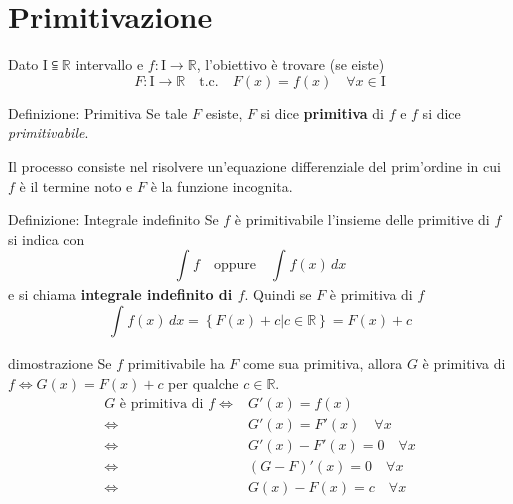 \documentclass[x11names]{article}
\begin{document}
	\newpage
	\section{Primitivazione}
	Dato $\text{I} \subseteqq \mathbb{R}$ intervallo e $f:\text{I} \to \mathbb{R}$, l'obiettivo è  trovare (se eiste)
	\[
	F: \text{I} \to \mathbb{R} \quad \text{t.c.} \quad F(x) = f(x) \quad \forall x \in \text{I}
	\]
	
		\begin{center}
		\colorbox{myblue}{\begin{minipage}{5.75in}
				\begin{blues}{Definizione: Primitiva}
					Se tale $F$ esiste, $F$ si dice \textbf{primitiva} di $f$ e $f$ si dice \textit{primitivabile}. 
				\end{blues}
		\end{minipage}}       
	\end{center}
	Il processo consiste nel risolvere un'equazione differenziale del prim'ordine in cui $f$ è il termine noto e $F$ è la funzione incognita.
	
		\begin{center}
		\colorbox{myblue}{\begin{minipage}{5.75in}
				\begin{blues}{Definizione: Integrale indefinito}
					Se $f$ è primitivabile l'insieme delle primitive di $f$ si indica con 
					\[
					\int_{}^{}f \quad \text{oppure} \quad \int_{}^{}f(x) \,dx
					\]
					e si chiama \textbf{integrale indefinito di $f$}. Quindi se  $F$ è primitiva di $f$
					\[
					\int_{}^{}f(x) \,dx  = \left\{F(x) + c | c \in \mathbb{R}\right\} = F(x) + c
					\]
				\end{blues}
		\end{minipage}}       
	\end{center}
	\begin{es}{dimostrazione}
		Se $f$ primitivabile ha $F$ come sua primitiva, allora $G$ è primitiva di $f \Longleftrightarrow G(x) = F(x) + c$ per qualche $c \in \mathbb{R}$.
		\begin{align*}
			G \text{ è primitiva di } f \Longleftrightarrow& G'(x) = f(x) \\
			\Longleftrightarrow& G'(x) = F'(x) \quad \forall x \\
			\Longleftrightarrow& G'(x) - F'(x) = 0 \quad \forall x \\
			\Longleftrightarrow& \left(G - F\right)'(x) = 0 \quad \forall x \\
			\Longleftrightarrow& G(x) - F(x) = c \quad \forall x 
		\end{align*}
	\end{es}
	
\end{document}

